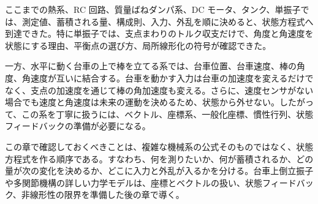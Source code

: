 ここまでの熱系、RC 回路、質量ばねダンパ系、DC モータ、タンク、単振子では、測定値、蓄積される量、構成則、入力、外乱を順に決めると、状態方程式へ到達できた。特に単振子では、支点まわりのトルク収支だけで、角度と角速度を状態にする理由、平衡点の選び方、局所線形化の符号が確認できた。

一方、水平に動く台車の上で棒を立てる系では、台車位置、台車速度、棒の角度、角速度が互いに結合する。台車を動かす入力は台車の加速度を変えるだけでなく、支点の加速度を通じて棒の角加速度も変える。さらに、速度センサがない場合でも速度と角速度は未来の運動を決めるため、状態から外せない。したがって、この系を丁寧に扱うには、ベクトル、座標系、一般化座標、慣性行列、状態フィードバックの準備が必要になる。

この章で確認しておくべきことは、複雑な機械系の公式そのものではなく、状態方程式を作る順序である。すなわち、何を測りたいか、何が蓄積されるか、どの量が次の変化を決めるか、どこに入力と外乱が入るかを分ける。台車上倒立振子や多関節機構の詳しい力学モデルは、座標とベクトルの扱い、状態フィードバック、非線形性の限界を準備した後の章で導く。
